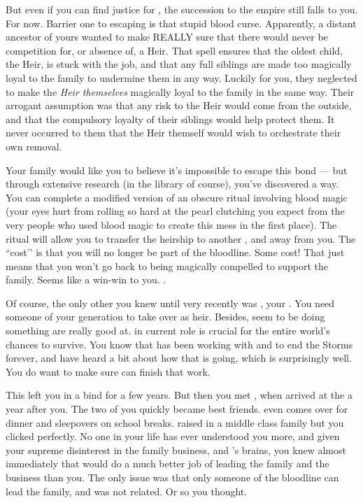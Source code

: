 \documentclass[char]{GL2020}
\begin{document}
But even if you can find justice for \cHeirSibling{}, the succession to the \cHeir{\formal} empire still falls to you. For now. Barrier one to escaping is that stupid blood curse. Apparently, a distant ancestor of yours wanted to make REALLY sure that there would never be competition for, or absence of, a \cHeir{\formal} Heir. That spell ensures that the oldest child, the Heir, is stuck with the job, and that any full siblings are made too magically loyal to the family to undermine them in any way. Luckily for you, they neglected to make the \emph{Heir themselves} magically loyal to the family in the same way. Their arrogant assumption was that any risk to the Heir would come from the outside, and that the compulsory loyalty of their siblings would help protect them. It never occurred to them that the Heir themself would wish to orchestrate their own removal. 

Your family would like you to believe it's impossible to escape this bond — but through extensive research (in the library of course), you've discovered a way. You can complete a modified version of an obscure ritual involving blood magic (your eyes hurt from rolling so hard at the pearl clutching you expect from the very people who used blood magic to create this mess in the first place). The ritual will allow you to transfer the heirship to another \cHeir{\formal}, and away from you. The ``cost’’ is that you will no longer be part of the bloodline. Some cost! That just means that you won’t go back to being magically compelled to support the family. Seems like a win-win to you. . 

Of course, the only other \cHeir{\formal} you knew until very recently was \cDiplomat{\full}, your \cDiplomat{\auncle}. You need someone of your generation to take over as heir.  Besides,\cDiplomat{\they} seem\cDiplomat{\verbs} to be doing something \cDiplomat{\they} are really good at. \cDiplomat{} in \cDiplomat{\their} current role is crucial for the entire world’s chances to survive. You know that \cDiplomat{} has been working with \cHeadScientist{\full} and \cAssistantScientist{\full} to end the Storms forever, and have heard a bit about how that is going, which is surprisingly well. You do want to make sure \cDiplomat{} can finish that work.

This left you in a bind for a few years. But then you met \cAmbition{}, when \cAmbition{\they} arrived at the \pSc{} a year after you. The two of you quickly became best friends. \cAmbition{} even comes over for dinner and sleepovers on school breaks. \cAmbition{\They} \cAmbition{\were} raised in a middle class family but you clicked perfectly. No one in your life has ever understood you more, and given your supreme disinterest in the family business, and \cAmbition{}’s brains, you knew almost immediately that \cAmbition{\they} would do a much better job of leading the family and the business than you. The only issue was that only someone of the \cHeir{\formal} bloodline can lead the family, and \cAmbition{} was not related. Or so you thought.  
\end{document}
